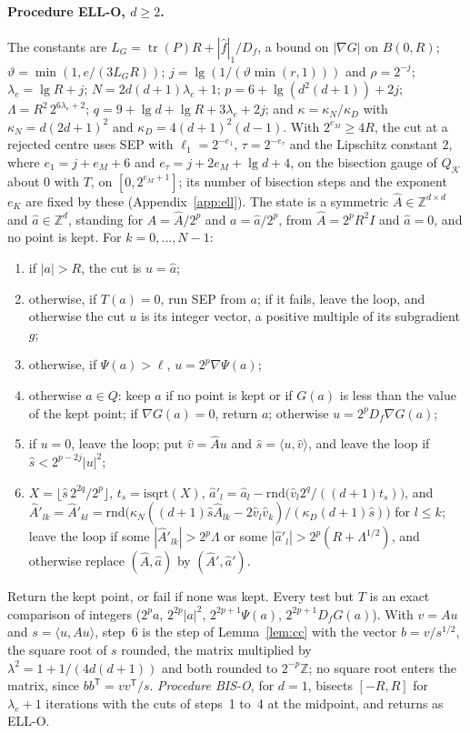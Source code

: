 \documentclass[11pt]{amsart}
\theoremstyle{definition}
\numberwithin{equation}{section}
\newcommand{\cK}{\mathcal{K}}
\newcommand{\tr}{\operatorname{tr}}
\newcommand{\ip}[1]{\langle #1\rangle}
\begin{document}
\paragraph{Procedure ELL-O, $d\ge2$.} The constants are $L_G=\tr(P)R+|\hat f|_1/D_f$, a bound on $|\nabla G|$ on $B(0,R)$; $\vartheta=\min(1,e/(3L_GR))$; $j=\lg(1/(\vartheta\min(r,1)))$ and $\rho=2^{-j}$; $\lambda_e=\lg R+j$; $N=2d(d+1)\lambda_e+1$; $p=6+\lg(d^2(d+1))+2j$; $\Lambda=R^2\,2^{6\lambda_e+2}$; $q=9+\lg d+\lg R+3\lambda_e+2j$; and $\kappa=\kappa_N/\kappa_D$ with $\kappa_N=d(2d+1)^2$ and $\kappa_D=4(d+1)^2(d-1)$. With $2^{e_M}\ge4R$, the cut at a rejected centre uses SEP with $\ell_1=2^{-e_1}$, $\tau=2^{-e_\tau}$ and the Lipschitz constant $2$, where $e_1=j+e_M+6$ and $e_\tau=j+2e_M+\lg d+4$, on the bisection gauge of $Q_\cK$ about $0$ with $T$, on $[0,2^{e_M+1}]$; its number of bisection steps and the exponent $e_K$ are fixed by these (Appendix~\ref{app:ell}). The state is a symmetric $\hat A\in\mathbb Z^{d\times d}$ and $\hat a\in\mathbb Z^d$, standing for $A=\hat A/2^p$ and $a=\hat a/2^p$, from $\hat A=2^pR^2I$ and $\hat a=0$, and no point is kept. For $k=0,\dots,N-1$:
\begin{enumerate}[label=\arabic*.,leftmargin=2em]
\item if $|a|>R$, the cut is $u=\hat a$;
\item otherwise, if $T(a)=0$, run SEP from $a$; if it fails, leave the loop, and otherwise the cut $u$ is its integer vector, a positive multiple of its subgradient $g$;
\item otherwise, if $\Psi(a)>\ell$, $u=2^p\nabla\Psi(a)$;
\item otherwise $a\in Q$: keep $a$ if no point is kept or if $G(a)$ is less than the value of the kept point; if $\nabla G(a)=0$, return $a$; otherwise $u=2^pD_f\nabla G(a)$;
\item if $u=0$, leave the loop; put $\hat v=\hat Au$ and $\hat s=\ip{u,\hat v}$, and leave the loop if $\hat s<2^{p-2j}|u|^2$;
\item $X=\lfloor\hat s\,2^{2q}/2^p\rfloor$, $t_s=\mathrm{isqrt}(X)$, $\hat a'_l=\hat a_l-\mathrm{rnd}\bigl(\hat v_l2^q/((d+1)t_s)\bigr)$, and $\hat A'_{lk}=\hat A'_{kl}=\mathrm{rnd}\bigl(\kappa_N((d+1)\hat s\hat A_{lk}-2\hat v_l\hat v_k)/(\kappa_D(d+1)\hat s)\bigr)$ for $l\le k$; leave the loop if some $|\hat A'_{lk}|>2^p\Lambda$ or some $|\hat a'_l|>2^p(R+\Lambda^{1/2})$, and otherwise replace $(\hat A,\hat a)$ by $(\hat A',\hat a')$.
\end{enumerate}
Return the kept point, or fail if none was kept. Every test but $T$ is an exact comparison of integers ($2^pa$, $2^{2p}|a|^2$, $2^{2p+1}\Psi(a)$, $2^{2p+1}D_fG(a)$). With $v=Au$ and $s=\ip{u,Au}$, step~6 is the step of Lemma~\ref{lem:cc} with the vector $b=v/s^{1/2}$, the square root of $s$ rounded, the matrix multiplied by $\lambda^2=1+1/(4d(d+1))$ and both rounded to $2^{-p}\mathbb Z$; no square root enters the matrix, since $bb^{\mathsf T}=vv^{\mathsf T}/s$. \emph{Procedure BIS-O}, for $d=1$, bisects $[-R,R]$ for $\lambda_e+1$ iterations with the cuts of steps~1 to~4 at the midpoint, and returns as ELL-O.
\end{document}
